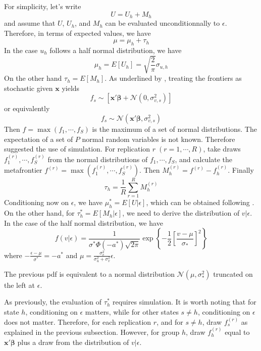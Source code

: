 \documentclass[nojss]{jss}
\begin{document}
 For simplicity, let's write
 $$U=U_{h} + M_{h}$$
 and assume that $U$, $U_h$, and $M_h$ can be evaluated unconditionnally to 
 $\epsilon$. Therefore, in terms of expected values, we have
 $$\mu = \mu_h + \tau_h$$
 In the case $u_h$ follows a half normal distribution, we have
 $$\mu_h = E\left[U_h\right] = \sqrt{\frac{2}{\pi}}\sigma_{u,h}$$
 On the other hand $\tau_h = E\left[M_h\right]$. As underlined by 
 \citet{am17}, treating the frontiers as stochastic given $\mathbf{x}$ yields
\begin{equation}\label{eq:3.2.11}
 f_s \sim \left[\mathbf{x}'\bm{\beta} + \mathcal{N}
 \left(0, \sigma_{v,s}^2\right)\right]
 \end{equation}
 or equivalently
\begin{equation}\label{eq:3.2.12}
 f_s \sim \mathcal{N}\left(\mathbf{x}'\bm{\beta}, 
 \sigma_{v,s}^2\right)
 \end{equation}
 Then $f = \max\left(f_1, \cdots, f_S\right)$ is the maximum of a set of 
 normal distributions. The expectation of a set of $P$ normal random 
 variables is not known. Therefore \citet{am17} suggested the use of 
 simulation. For replication $r \; (r = 1, \cdots, R)$, take draws 
 $f_1^{(r)}, \cdots, f_S^{(r)}$ from the normal distributions of 
 $f_1, \cdots, f_S$, and calculate the metafrontier 
 $f^{(r)} = \max(f_1^{(r)}, \cdots, f_S^{(r)})$. Then 
 $M_h^{(r)} = f^{(r)}-f_h^{(r)}$. Finally 
\begin{equation}\label{eq:3.2.13}
 \tau_h = \frac{1}{R}\sum_{r = 1}^{R}M_h^{(r)}
 \end{equation}
 Conditioning now on $\epsilon$, we have $\mu_h^*=E\left[U|\epsilon\right]$, 
 which can be obtained following \citet{jon82}. On the other hand, for 
 $\tau_h^*=E\left[M_h|\epsilon\right]$, we need to derive the distribution 
 of $v|\epsilon$. In the case of the half normal distribution, we have
\begin{equation}\label{eq:3.2.14}
 f(v|\epsilon)=\frac{1}{\sigma^*\Phi\left(-a^*\right)\sqrt{2\pi}}
 \exp\left\{-\frac{1}{2}\left[\frac{v-\mu}{\sigma_*}\right]^2\right\}
 \end{equation}
 where $-\frac{\epsilon - \mu}{\sigma^*}=-a^*$ and 
 $\mu = \frac{\sigma_v^2}{\sigma_u^2 + \sigma_v^2}\epsilon$.
 
 The previous pdf is equivalent to a normal distribution 
 $\mathcal{N}\left(\mu, \sigma_*^2\right)$ truncated on the left at 
 $\epsilon$.
 
 As previously, the evaluation of $\tau_h^*$ requires simulation. It  is 
 worth noting that for state $h$, conditioning on $\epsilon$ matters, 
 while for other states $s\neq h$, conditioning on $\epsilon$ does not 
 matter. Therefore, for each replication $r$, and for $s\neq h$, 
 draw $f_s^{(r)}$ as explained in the previous subsection. However, for 
 group $h$, draw $f_h^{(r)}$ equal to $\mathbf{x}'\bm{\beta}$ plus a draw from 
 the distribution of $v|\epsilon$.
 
\end{document}
